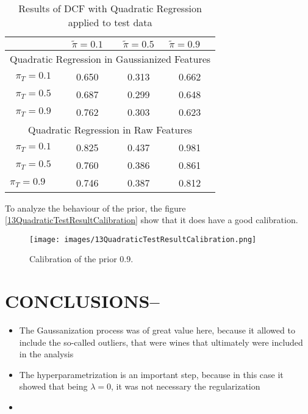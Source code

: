 \documentclass[12pt, twocolumn]{article}
\begin{document}
\begin{table}[h]
\caption{\label{tab:quad-results}Results of DCF with Quadratic Regression applied to test data}
\begin{center}
\begin{tabular}{cccc}
\hline
\multicolumn{1}{l}{} & \textbf{$\tilde{\pi } = 0.1$} & \textbf{$\tilde{\pi } = 0.5$} & \multicolumn{1}{l}{\textbf{$\tilde{\pi}  = 0.9$}} \\ \hline
\multicolumn{4}{c}{Quadratic Regression in Gaussianized Features} \\ \hline
\multicolumn{1}{c|}{$\pi_T = 0.1$}   & 0.650   & 0.313   & 0.662  \\
\multicolumn{1}{c|}{$\pi_T = 0.5$}   & 0.687   & 0.299   & 0.648  \\
\multicolumn{1}{c|}{$\pi_T = 0.9$}   & 0.762   & 0.303   & 0.623  \\ \hline
\multicolumn{4}{c}{Quadratic Regression in Raw Features}          \\ \hline
\multicolumn{1}{c|}{$\pi_T = 0.1$}   & 0.825   & 0.437   & 0.981  \\
\multicolumn{1}{c|}{$\pi_T = 0.5$}   & 0.760   & 0.386   & 0.861  \\
\multicolumn{1}{l|}{$\pi_T = 0.9$}   & 0.746   & 0.387   & 0.812  \\ \hline
\end{tabular}
\end{center}
\end{table}
  
To analyze the behaviour of the prior, the figure \ref{13QuadraticTestResultCalibration}
show that it does have a good calibration.

  \begin{figure}[ht]
    \centering
    \texttt{[image: images/13QuadraticTestResultCalibration.png]}
    \caption{Calibration of the prior 0.9.}
    \label{fig:13QuadraticTestResultCalibration}
  \end{figure}
  
  
  \section{CONCLUSIONS--}
  \begin{itemize}
  \item The Gaussanization process was of great value here, because it allowed to include the so-called outliers, that were wines that ultimately were included in the analysis
  \item The hyperparametrization is an important step, because in this case it showed that being $\lambda =0$, it was not necessary the regularization
  \item 
  \end{itemize}
  
  

  
  
\end{document}
